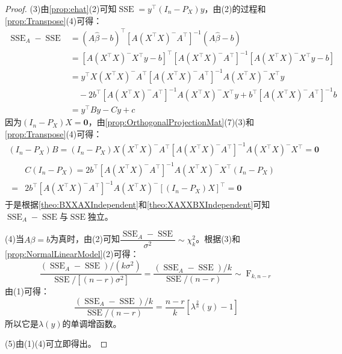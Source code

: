 \begin{proof}
	(3)由\cref{prop:ehat}(2)可知$\operatorname{SSE}=y^{\top}(I_n-P_X)y$，由(2)的过程和\cref{prop:Transpose}(4)可得：
	\begin{align*}
		\operatorname{SSE}_A-\operatorname{SSE}&=(A\hat{\beta}-b)^{\top}[A(X^{\top}X)^-A^{\top}]^{-1}(A\hat{\beta}-b) \\
		&=[A(X^{\top}X)^-X^{\top}y-b]^{\top}[A(X^{\top}X)^-A^{\top}]^{-1}[A(X^{\top}X)^-X^{\top}y-b] \\
		&=y^{\top}X(X^{\top}X)^-A^{\top}[A(X^{\top}X)^-A^{\top}]^{-1}A(X^{\top}X)^-X^{\top}y \\
		&\quad-2b^{\top}[A(X^{\top}X)^-A^{\top}]^{-1}A(X^{\top}X)^-X^{\top}y+b^{\top}[A(X^{\top}X)^-A^{\top}]^{-1}b \\
		&=y^{\top}By-Cy+c
	\end{align*}
	因为$(I_n-P_X)X=\mathbf{0}$，由\cref{prop:OrthogonalProjectionMat}(7)(3)和\cref{prop:Transpose}(4)可得：
	\begin{gather*}
		(I_n-P_X)B=(I_n-P_X)X(X^{\top}X)^-A^{\top}[A(X^{\top}X)^-A^{\top}]^{-1}A(X^{\top}X)^-X^{\top}=\mathbf{0} \\
		\begin{aligned}
			&C(I_n-P_X)=2b^{\top}[A(X^{\top}X)^-A^{\top}]^{-1}A(X^{\top}X)^-X^{\top}(I_n-P_X) \\
			=&2b^{\top}[A(X^{\top}X)^-A^{\top}]^{-1}A(X^{\top}X)^-[(I_n-P_X)X]^{\top}=\mathbf{0}
		\end{aligned}
	\end{gather*}
	于是根据\cref{theo:BXXAXIndependent}和\cref{theo:XAXXBXIndependent}可知$\operatorname{SSE}_A-\operatorname{SSE}$与$\operatorname{SSE}$独立。\par
	(4)当$A\beta=b$为真时，由(2)可知$\dfrac{\operatorname{SSE}_A-\operatorname{SSE}}{\sigma^2}\sim\chi^2_{k}$。根据(3)和\cref{prop:NormalLinearModel}(2)可得：
	\begin{equation*}
		\frac{(\operatorname{SSE}_A-\operatorname{SSE})/(k\sigma^2)}{\operatorname{SSE}/[(n-r)\sigma^2]}=\frac{(\operatorname{SSE}_A-\operatorname{SSE})/k}{\operatorname{SSE}/(n-r)}\sim\operatorname{F}_{k,n-r}
	\end{equation*}
	由(1)可得：
	\begin{equation*}
		\frac{(\operatorname{SSE}_A-\operatorname{SSE})/k}{\operatorname{SSE}/(n-r)}=\frac{n-r}{k}[\lambda^{\frac{2}{n}}(y)-1]
	\end{equation*}
	所以它是$\lambda(y)$的单调增函数。\par
	(5)由(1)(4)可立即得出。
\end{proof}

